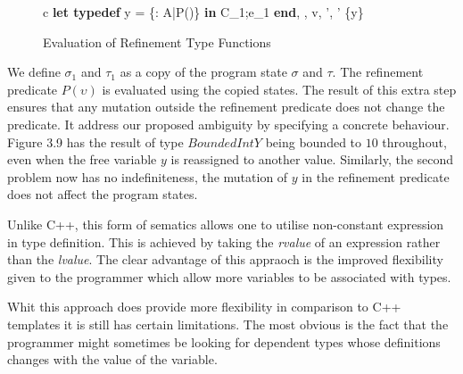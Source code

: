 \documentclass[a4paper,12pt]{report}
\begin{document}
\begin{figure}[H]
  \begin{center}
    \begin{tabular} {c}
      {\langle\textbf{let typedef } y = \{\upsilon : A\text{ }|\text{ }P(\upsilon)\} \textbf{ in }C_1;e_1\textbf{ end}, 
      \sigma, \tau \rangle \Longrightarrow \langle v, \sigma', \tau' \setminus \{y\} \rangle} 
    \end{tabular}
  \end{center}
  \caption{Evaluation of Refinement Type Functions}
\end{figure}

\par
We define $\sigma_1$ and $\tau_1$ as a copy of the program state $\sigma$ and 
$\tau$. The refinement predicate $P(\upsilon)$ is evaluated using the copied 
states. The result of this extra step ensures that any mutation outside the 
refinement predicate does not change the predicate. It address our proposed 
ambiguity by specifying a concrete behaviour. Figure 3.9 has the result of type 
$BoundedIntY$ being bounded to $10$ throughout, even when the free variable $y$ 
is reassigned to another value. Similarly, the second problem now has no 
indefiniteness, the mutation of $y$ in the refinement predicate does not affect 
the program states. 
 
\par
Unlike C++, this form of sematics allows one to utilise non-constant expression 
in type definition. This is achieved by taking the \textit{rvalue} \cite{cpplrvalues} 
of an expression rather than the \textit{lvalue}. The clear advantage of this 
appraoch is the improved flexibility given to the programmer which allow more 
variables to be associated with types. 

\par
Whit this approach does provide more flexibility in comparison to 
C++ templates it is still has certain limitations. The most obvious is the fact 
that the programmer might sometimes be looking for dependent types 
whose definitions changes with the value of the variable. 
\end{document}
